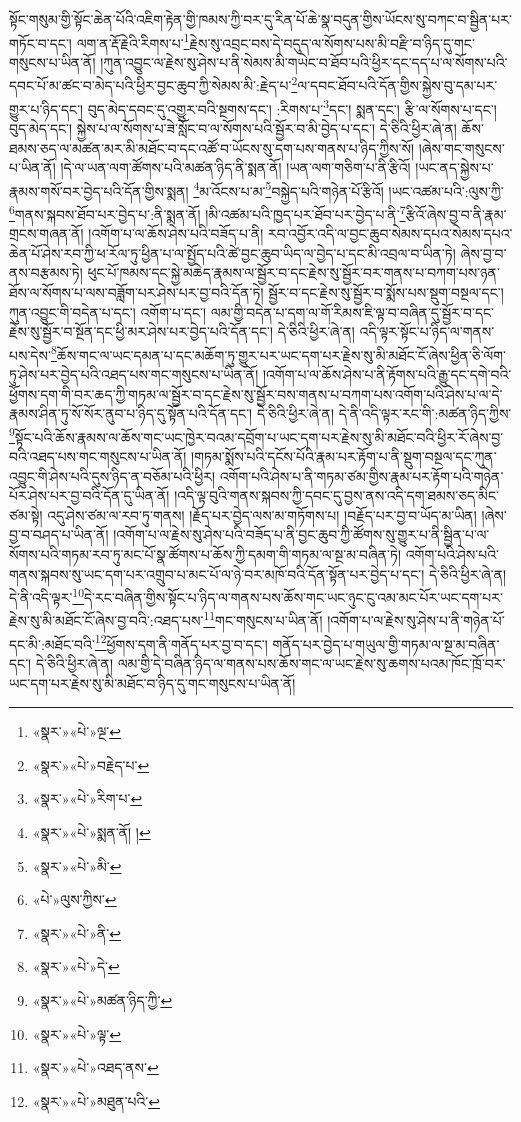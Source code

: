 སྟོང་གསུམ་གྱི་སྟོང་ཆེན་པོའི་འཇིག་རྟེན་གྱི་ཁམས་ཀྱི་བར་དུ་རིན་པོ་ཆེ་སྣ་བདུན་གྱིས་ཡོངས་སུ་བཀང་བ་སྦྱིན་པར་གཏོང་བ་དང་། ལག་ན་རྡོ་རྗེའི་རིགས་པ་\footnote{«སྣར་»«པེ་»ལྔ་}རྗེས་སུ་འབྲང་བས་དེ་བདུད་ལ་སོགས་པས་མི་བརྫི་བ་ཉིད་དུ་གང་གསུངས་པ་ཡིན་ནོ། །ཀུན་འབྱུང་ལ་རྗེས་སུ་ཤེས་པ་ནི་སེམས་མི་གཡེང་བ་ཐོབ་པའི་ཕྱིར་དང་དད་པ་ལ་སོགས་པའི་དབང་པོ་མ་ཚང་བ་མེད་པའི་ཕྱིར་བྱང་ཆུབ་ཀྱི་སེམས་མི་:རྗེད་པ་\footnote{«སྣར་»«པེ་»བརྗེད་པ་}ལ་དབང་ཐོབ་པའི་དོན་གྱིས་སྐྱེས་བུ་དམ་པར་གྱུར་པ་ཉིད་དང་། བུད་མེད་དབང་དུ་འགྱུར་བའི་སྔགས་དང་། :རིགས་པ་\footnote{«སྣར་»«པེ་»རིག་པ་}དང་། སྨན་དང་། རྩི་ལ་སོགས་པ་དང་། བུད་མེད་དང་། སྐྱེས་པ་ལ་སོགས་པ་ཟེ་སློང་བ་ལ་སོགས་པའི་སྦྱོར་བ་མི་བྱེད་པ་དང་། དེ་ཅིའི་ཕྱིར་ཞེ་ན། ཆོས་ཐམས་ཅད་ལ་མཚན་མར་མི་མཐོང་བ་དང་འཚོ་བ་ཡོངས་སུ་དག་པས་གནས་པ་ཉིད་ཀྱིས་སོ། །ཞེས་གང་གསུངས་པ་ཡིན་ནོ། །དེ་ལ་ཡན་ལག་ཚོགས་པའི་མཚན་ཉིད་ནི་སྨན་ནོ། །ཡན་ལག་གཅིག་པ་ནི་རྩིའོ། །ཡང་ནད་སྐྱེས་པ་རྣམས་གསོ་བར་བྱེད་པའི་དོན་གྱིས་སྨན། \footnote{«སྣར་»«པེ་»སྨན་ནོ། ། }མ་འོངས་པ་མ་\footnote{«སྣར་»«པེ་»མི་}བསྐྱེད་པའི་གཉེན་པོ་རྩིའོ། །ཡང་འཚམ་པའི་:ལུས་ཀྱི་\footnote{«པེ་»ལུས་ཀྱིས་}གནས་སྐབས་ཐོབ་པར་བྱེད་པ་:ནི་སྨན་ནོ། །མི་འཚམ་པའི་ཁྱད་པར་ཐོབ་པར་བྱེད་པ་ནི་\footnote{«སྣར་»«པེ་»ནི་}རྩིའོ་ཞེས་བྱ་བ་ནི་རྣམ་གྲངས་གཞན་ནོ། །འགོག་པ་ལ་ཆོས་ཤེས་པའི་བཟོད་པ་ནི། རབ་འབྱོར་འདི་ལ་བྱང་ཆུབ་སེམས་དཔའ་སེམས་དཔའ་ཆེན་པོ་ཤེས་རབ་ཀྱི་ཕ་རོལ་ཏུ་ཕྱིན་པ་ལ་སྤྱོད་པའི་ཚེ་བྱང་ཆུབ་ཡིད་ལ་བྱེད་པ་དང་མི་འབྲལ་བ་ཡིན་ཏེ། ཞེས་བྱ་བ་ནས་བརྩམས་ཏེ། ཕུང་པོ་ཁམས་དང་སྐྱེ་མཆེད་རྣམས་ལ་སྦྱོར་བ་དང་རྗེས་སུ་སྦྱོར་བར་གནས་པ་བཀག་པས་ཉན་ཐོས་ལ་སོགས་པ་ལས་བཟློག་པར་ཤེས་པར་བྱ་བའི་དོན་ཏེ། སྦྱོར་བ་དང་རྗེས་སུ་སྦྱོར་བ་སྨོས་པས་སྡུག་བསྔལ་དང་། ཀུན་འབྱུང་གི་བདེན་པ་དང་། འགོག་པ་དང་། ལམ་གྱི་བདེན་པ་དག་ལ་གོ་རིམས་ཇི་ལྟ་བ་བཞིན་དུ་སྦྱོར་བ་དང་རྗེས་སུ་སྦྱོར་བ་སྔོན་དང་ཕྱི་མར་ཤེས་པར་བྱེད་པའི་དོན་དང་། དེ་ཅིའི་ཕྱིར་ཞེ་ན། འདི་ལྟར་སྟོང་པ་ཉིད་ལ་གནས་པས་དེས་\footnote{«སྣར་»«པེ་»དེ་}ཆོས་གང་ལ་ཡང་དམན་པ་དང་མཆོག་ཏུ་གྱུར་པར་ཡང་དག་པར་རྗེས་སུ་མི་མཐོང་ངོ་ཞེས་ཕྱིན་ཅི་ལོག་ཏུ་ཤེས་པར་བྱེད་པའི་འཐད་པས་གང་གསུངས་པ་ཡིན་ནོ། །འགོག་པ་ལ་ཆོས་ཤེས་པ་ནི་རྟོགས་པའི་རྒྱུ་དང་དགེ་བའི་ཕྱོགས་དག་གི་བར་ཆད་ཀྱི་གཏམ་ལ་སྦྱོར་བ་དང་རྗེས་སུ་སྦྱོར་བས་གནས་པ་བཀག་པས་འགོག་པའི་ཤེས་པ་ལ་དེ་རྣམས་ཤིན་ཏུ་སོ་སོར་ནུབ་པ་ཉིད་དུ་སྟོན་པའི་དོན་དང་། དེ་ཅིའི་ཕྱིར་ཞེ་ན། དེ་ནི་འདི་ལྟར་རང་གི་:མཚན་ཉིད་ཀྱིས་\footnote{«སྣར་»«པེ་»མཚན་ཉིད་ཀྱི་}སྟོང་པའི་ཆོས་རྣམས་ལ་ཆོས་གང་ཡང་ཁྱེར་བའམ་དབྲོག་པ་ཡང་དག་པར་རྗེས་སུ་མི་མཐོང་བའི་ཕྱིར་རོ་ཞེས་བྱ་བའི་འཐད་པས་གང་གསུངས་པ་ཡིན་ནོ། །གཏམ་སྨོས་པའི་དངོས་པོའི་རྣམ་པར་རྟོག་པ་ནི་སྡུག་བསྔལ་དང་ཀུན་འབྱུང་གི་ཤེས་པའི་དུས་ཉིད་ན་བཅོམ་པའི་ཕྱིར། འགོག་པའི་ཤེས་པ་ནི་གཏམ་ཙམ་གྱིས་རྣམ་པར་རྟོག་པའི་གཉེན་པོར་ཤེས་པར་བྱ་བའི་དོན་དུ་ཡིན་ནོ། །འདི་ལྟ་བུའི་གནས་སྐབས་ཀྱི་དབང་དུ་བྱས་ནས་འདི་དག་ཐམས་ཅད་མིང་ཙམ་སྟེ། འདུ་ཤེས་ཙམ་ལ་རབ་ཏུ་གནས། །རྗོད་པར་བྱེད་ལས་མ་གཏོགས་པ། །བརྗོད་པར་བྱ་བ་ཡོད་མ་ཡིན། །ཞེས་བྱ་བ་བཤད་པ་ཡིན་ནོ། །འགོག་པ་ལ་རྗེས་སུ་ཤེས་པའི་བཟོད་པ་ནི་བྱང་ཆུབ་ཀྱི་ཚོགས་སུ་གྱུར་པ་ནི་སྦྱིན་པ་ལ་སོགས་པའི་གཏམ་རབ་ཏུ་མང་པོ་སྣ་ཚོགས་པ་ཆོས་ཀྱི་དམག་གི་གཏམ་ལ་སྔ་མ་བཞིན་ཏེ། འགོག་པའི་ཤེས་པའི་གནས་སྐབས་སུ་ཡང་དག་པར་འགྲུབ་པ་མང་པོ་ལ་ཉེ་བར་མཁོ་བའི་དོན་སྟོན་པར་བྱེད་པ་དང་། དེ་ཅིའི་ཕྱིར་ཞེ་ན། དེ་ནི་འདི་ལྟར་\footnote{«སྣར་»«པེ་»ལྟ་}དེ་རང་བཞིན་གྱིས་སྟོང་པ་ཉིད་ལ་གནས་པས་ཆོས་གང་ཡང་ཉུང་ངུ་འམ་མང་པོར་ཡང་དག་པར་རྗེས་སུ་མི་མཐོང་ངོ་ཞེས་བྱ་བའི་:འཐད་པས་\footnote{«སྣར་»«པེ་»འཐད་ནས་}གང་གསུངས་པ་ཡིན་ནོ། །འགོག་པ་ལ་རྗེས་སུ་ཤེས་པ་ནི་གཉེན་པོ་དང་མི་:མཐོང་བའི་\footnote{«སྣར་»«པེ་»མཐུན་པའི་}ཕྱོགས་དག་ནི་གནོད་པར་བྱ་བ་དང་། གནོད་པར་བྱེད་པ་གཡུལ་གྱི་གཏམ་ལ་སྔ་མ་བཞིན་དང་། དེ་ཅིའི་ཕྱིར་ཞེ་ན། ལམ་གྱི་དེ་བཞིན་ཉིད་ལ་གནས་པས་ཆོས་གང་ལ་ཡང་རྗེས་སུ་ཆགས་པའམ་ཁོང་ཁྲོ་བར་ཡང་དག་པར་རྗེས་སུ་མི་མཐོང་བ་ཉིད་དུ་གང་གསུངས་པ་ཡིན་ནོ། 
